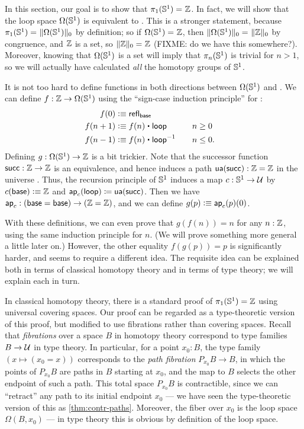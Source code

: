In this section, our goal is to show that $\id {\pi_1(\Sn ^1)} {\Z}$.
In fact, we will show that the loop space ${\Omega(\Sn ^1)}$ is equivalent to \Z.
This is a stronger statement, because $\id{\pi_1(\Sn ^1)} {\trunc 0 {\Omega(\Sn ^1)}}$ by
definition; so if $\id {\Omega(\Sn ^1)} {\Z}$, then $\id {\trunc
  0 {\Omega(\Sn ^1)}} {\trunc 0 {\Z}}$ by congruence, and
$\Z$ is a set, so $\id {\trunc 0 {\Z}} {\Z}$
(FIXME: do we have this somewhere?).  
Moreover, knowing that ${\Omega(\Sn ^1)}$ is a set will imply that $\pi_n(\Sn^1)$ is trivial for $n>1$, so we will actually have calculated \emph{all} the homotopy groups of $\Sn^1$.

It is not too hard to define functions in both directions between $\Omega(\Sn^1)$ and \Z.
We can define $f:\Z\to\Omega(\Sn^1)$ using the ``sign-case induction principle'' for \Z:
\begin{alignat*}{2}
  f(0) &\defeq \refl{\base}\\
  f(n+1) &\defeq f(n) \ct \lloop
  &&\quad n\ge 0\\
  f(n-1) &\defeq f(n) \ct \opp\lloop
  &&\quad n\le 0.
\end{alignat*}
Defining $g:\Omega(\Sn^1)\to\Z$ is a bit trickier.
Note that the successor function $\Zsuc:\Z\to\Z$ is an equivalence, and hence induces a path $\ua(\Zsuc):\Z=\Z$ in the universe \type.
Thus, the recursion principle of $\Sn^1$ induces a map $c:\Sn^1\to\type$ by $c(\base)\defeq \Z$ and $\apfunc c (\lloop) \defid \ua(\Zsuc)$.
Then we have $\apfunc{c} : (\base=\base) \to (\Z=\Z)$, and we can define $g(p)\defeq \apfunc{c}(p)(0)$.

With these definitions, we can even prove that $g(f(n))=n$ for any $n:\Z$, using the same induction principle for $n$.
(We will prove something more general a little later on.)
However, the other equality $f(g(p))=p$ is significantly harder, and seems to require a different idea.
The requisite idea can be explained both in terms of classical homotopy theory and in terms of type theory; we will explain each in turn.

In classical homotopy theory, there is a standard proof of $\pi_1(\Sn^1)=\Z$ using universal covering spaces.
Our proof can be regarded as a type-theoretic version of this proof, but modified to use fibrations rather than covering spaces.
Recall that \emph{fibrations} over a space $B$ in homotopy theory correspond to type families $B\to\type$ in type theory.
In particular, for a point $x_0:B$, the type family $(x\mapsto (x_0=x))$ corresponds to the \emph{path fibration} $P_{x_0} B \to B$, in which the points of $P_{x_0} B$ are paths in $B$ starting at $x_0$, and the map to $B$ selects the other endpoint of such a path.
This total space $P_{x_0} B$ is contractible, since we can ``retract'' any path to its initial endpoint $x_0$ --- we have seen the type-theoretic version of this as \autoref{thm:contr-paths}.
Moreover, the fiber over $x_0$ is the loop space $\Omega(B,x_0)$ --- in type theory this is obvious by definition of the loop space.


